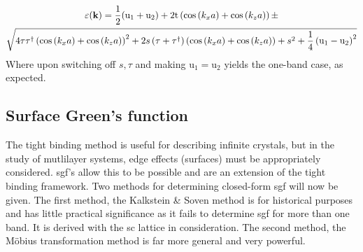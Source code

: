 \documentclass[a4paper, 12pt]{article}
\begin{document}
	\begin{multline}
		\varepsilon({\bf k}) =\frac{1}{2}({\rm u}_1+{\rm u}_2)+2{\rm t}\left(\cos \left( k_x a \right)+ \cos \left( k_z a \right) \right)
 \pm \\\sqrt{ 4 \tau\tau^\dagger\left(\cos \left( k_x a \right) +\cos \left( k_z a \right)\right)^2
 +2{\mathnormal s}\left(\tau+\tau^\dagger\right)
 \left(\cos \left( k_x a \right)+\cos \left( k_z a \right)\right) +s^2+\frac{1}{4}\left({\rm u}_1 -{\rm u}_2\right)^2}
	\end{multline}
	Where upon switching off $s, \tau$ and making u$_1 = $u$_2$ yields the one-band case, as expected.
	

	\subsection{Surface Green's function}
	The tight binding method is useful for describing infinite crystals, but in the study of mutlilayer systems, edge effects (surfaces) must be appropriately considered.
	\gls{sgf}'s allow this to be possible and are an extension of the tight binding framework.
	Two methods for determining closed-form \gls{sgf} will now be given. The first method, the Kalkstein \& Soven method is for historical purposes and has little practical significance as it fails to determine \gls{sgf} for more than one band. It is derived with the \gls{sc} lattice in consideration. The second method, the M\"{o}bius transformation method is far more general and very powerful.
\end{document}
